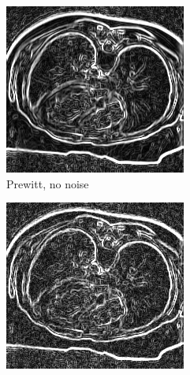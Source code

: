 \begin{figure}[H]
  \centering
  
  \begin{subfigure}{.5\textwidth}
    \centering
    \includegraphics[width=.9\textwidth]{./edgedetection/images/prewitt_no_noise}
    \caption{Prewitt, no noise}
    \label{fig:prewitt_no_noise}
  \end{subfigure}%
  \begin{subfigure}{.5\textwidth}
    \centering
    \includegraphics[width=.9\textwidth]{./edgedetection/images/prewitt_001_noise}

\end{subfigure}
\end{figure}
